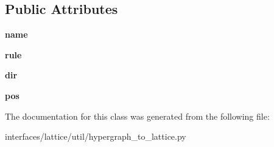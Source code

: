 \subsection*{Public Attributes}
\begin{DoxyCompactItemize}
\item 
\hypertarget{classhypergraph__to__lattice_1_1InternalNode_a41a36188327a12cdb33ffb206ee7823f}{
{\bfseries name}}
\label{classhypergraph__to__lattice_1_1InternalNode_a41a36188327a12cdb33ffb206ee7823f}

\item 
\hypertarget{classhypergraph__to__lattice_1_1InternalNode_a67c5d4c549c83619233496bf0c230e0e}{
{\bfseries rule}}
\label{classhypergraph__to__lattice_1_1InternalNode_a67c5d4c549c83619233496bf0c230e0e}

\item 
\hypertarget{classhypergraph__to__lattice_1_1InternalNode_ae5d2c0ddc19817e0d45e2eacb6bd0766}{
{\bfseries dir}}
\label{classhypergraph__to__lattice_1_1InternalNode_ae5d2c0ddc19817e0d45e2eacb6bd0766}

\item 
\hypertarget{classhypergraph__to__lattice_1_1InternalNode_ab596886460b8c32f441c1f4c999b1ac0}{
{\bfseries pos}}
\label{classhypergraph__to__lattice_1_1InternalNode_ab596886460b8c32f441c1f4c999b1ac0}

\end{DoxyCompactItemize}


The documentation for this class was generated from the following file:\begin{DoxyCompactItemize}
\item 
interfaces/lattice/util/hypergraph\_\-to\_\-lattice.py\end{DoxyCompactItemize}
